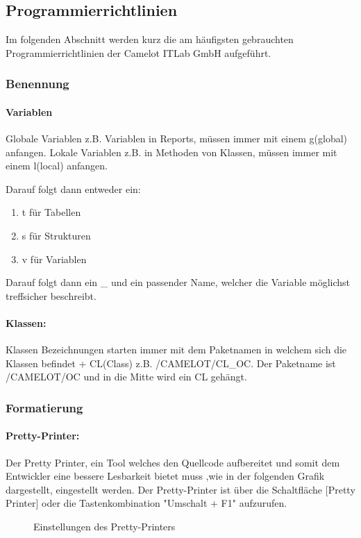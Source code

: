 \subsection{Programmierrichtlinien}
\label{app:Programmierrichtlinien}
Im folgenden Abschnitt werden kurz die am häufigsten gebrauchten Programmierrichtlinien der Camelot ITLab GmbH aufgeführt.

\subsubsection{Benennung}
\label{Benennung}
\paragraph{Variablen}
Globale Variablen z.B. Variablen in Reports, müssen immer mit einem g(global) anfangen. 
Lokale Variablen z.B. in Methoden von Klassen, müssen immer mit einem l(local) anfangen.

Darauf folgt dann entweder ein:
\begin{enumerate}
	\item t für Tabellen
	\item s für Strukturen
	\item v für Variablen
\end{enumerate}
	
Darauf folgt dann ein \_ und ein passender Name, welcher die Variable möglichst treffsicher beschreibt.

\paragraph{Klassen:}
Klassen Bezeichnungen starten immer mit dem Paketnamen in welchem sich die Klassen befindet + CL(Class) z.B. /CAMELOT/CL\_OC. Der Paketname ist /CAMELOT/OC und in die Mitte wird ein CL gehängt.

\subsubsection{Formatierung}
\label{Formatierung}
\paragraph{Pretty-Printer:}
Der Pretty Printer, ein Tool welches den Quellcode aufbereitet und somit dem Entwickler eine bessere Lesbarkeit bietet muss ,wie in der folgenden Grafik dargestellt, eingestellt werden. Der Pretty-Printer ist über die Schaltfläche [Pretty Printer] oder die Tastenkombination "Umschalt + F1" aufzurufen.
\begin{figure}[htb]
	\centering
	\caption{Einstellungen des Pretty-Printers}
\end{figure}



	

